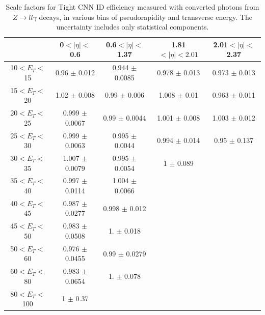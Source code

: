 \begin{table}[htbp]
    \centering
   \begin{tabular}{ccccc}
   \hline\hline
     & 0$<|\eta|<$0.6 & 0.6$<|\eta|<$1.37 & 1.81$<|\eta|<2.01$  & 2.01$<|\eta|<$2.37 \\
    \hline
10$<E_T<$15   & 0.96 $\pm$ 0.012   & 0.944 $\pm$ 0.0085 & 0.978 $\pm$ 0.013  & 0.973 $\pm$ 0.013\\
15$<E_T<$20   & 1.02 $\pm$ 0.008   & 0.99  $\pm$ 0.006  & 1.008 $\pm$ 0.01   & 0.963 $\pm$ 0.011\\
20$<E_T<$25   & 0.999 $\pm$ 0.0067 & 0.99  $\pm$ 0.0044 & 1.001 $\pm$ 0.008  & 1.003 $\pm$ 0.012\\
25$<E_T<$30   & 0.999 $\pm$ 0.0063 & 0.995 $\pm$ 0.0044 & 0.994 $\pm$ 0.014  & 0.95  $\pm$ 0.137\\
30$<E_T<$35   & 1.007 $\pm$ 0.0079 & 0.995 $\pm$ 0.0054 & 1     $\pm$ 0.089  & \\
35$<E_T<$40   & 0.997 $\pm$ 0.0114 & 1.004 $\pm$ 0.0066 &                    & \\
40$<E_T<$45   & 0.987 $\pm$ 0.0277 & 0.998 $\pm$ 0.012  &                    & \\
45$<E_T<$50   & 0.983 $\pm$ 0.0508 & 1.    $\pm$ 0.018  &                    & \\
50$<E_T<$60   & 0.976 $\pm$ 0.0455 & 0.99  $\pm$ 0.0279 &                    & \\
60$<E_T<$80   & 0.983 $\pm$ 0.0654 & 1.    $\pm$ 0.078  &                    & \\
80$<E_T<$100  & 1     $\pm$ 0.37   &                    &                    & \\
\hline\hline
\end{tabular}
\begin{tcolorbox}[colback=black!5!white,colframe=white!75!black]
\caption{Scale factors for Tight CNN ID efficiency measured with converted photons from $Z\rightarrow ll\gamma$ decays, in various bins of pseudorapidity and transverse energy. The uncertainty includes only statistical components.}
\label{tab:gamma:CNN:Zllg:SF:C}
\end{tcolorbox}

\end{table}


